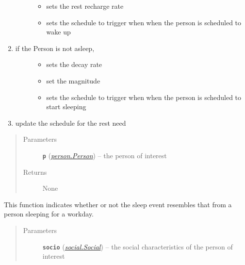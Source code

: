 \documentclass[letterpaper,10pt,english]{sphinxmanual}
\begin{document}
\begin{fulllineitems}
\begin{fulllineitems}
\begin{enumerate}
\begin{description}
\begin{itemize}
\item {} 
sets the rest recharge rate

\item {} 
sets the schedule to trigger when when the person is scheduled to wake up

\end{itemize}

\end{description}

\item {} \begin{description}
\item[{if the Person is not asleep, }] \leavevmode\begin{itemize}
\item {} 
sets the decay rate

\item {} 
set the magnitude

\item {} 
sets the schedule to trigger when when the person is scheduled to start sleeping

\end{itemize}

\end{description}

\item {} 
update the schedule for the rest need

\end{enumerate}
\begin{quote}\begin{description}
\item[{Parameters}] \leavevmode
\textbf{\texttt{p}} ({\hyperref[person:person.Person]{\emph{\emph{person.Person}}}}) -- the person of interest

\item[{Returns}] \leavevmode
None

\end{description}\end{quote}

\end{fulllineitems}


\begin{fulllineitems}
\label{rest:rest.Rest.is_workday}
This function indicates whether or not the sleep event resembles that from a person sleeping for         a workday.
\begin{quote}\begin{description}
\item[{Parameters}] \leavevmode
\textbf{\texttt{socio}} ({\hyperref[social:social.Social]{\emph{\emph{social.Social}}}}) -- the social characteristics of the person of interest


\end{description}
\end{quote}
\end{fulllineitems}
\end{fulllineitems}
\end{document}
